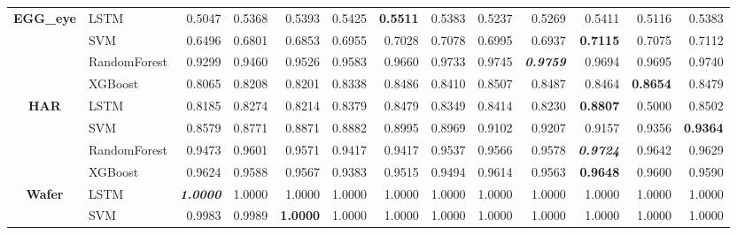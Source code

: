 \begin{table}[H]
\begin{adjustbox}{max width=14cm}
\begin{tabular}{|c|l|r|r|r|r|r|r|r|r|r|r|r|}
			\hline
			\textbf{EGG\_eye}     & LSTM         & 0.5047                   & 0.5368 & 0.5393          & 0.5425 & \textbf{0.5511} & 0.5383 & 0.5237          & 0.5269                   & 0.5411                   & 0.5116          & 0.5383 \\
			                      & SVM          & 0.6496                   & 0.6801 & 0.6853          & 0.6955 & 0.7028          & 0.7078 & 0.6995          & 0.6937                   & \textbf{0.7115}          & 0.7075          & 0.7112 \\
			                      & RandomForest & 0.9299                   & 0.9460 & 0.9526          & 0.9583 & 0.9660          & 0.9733 & 0.9745          & \textit{\textbf{0.9759}} & 0.9694                   & 0.9695          & 0.9740 \\
			                      & XGBoost      & 0.8065                   & 0.8208 & 0.8201          & 0.8338 & 0.8486          & 0.8410 & 0.8507          & 0.8487                   & 0.8464                   & \textbf{0.8654} & 0.8479 \\
			\hline
			\textbf{HAR}          & LSTM         & 0.8185                   & 0.8274 & 0.8214          & 0.8379 & 0.8479          & 0.8349 & 0.8414          & 0.8230                   & \textbf{0.8807}          & 0.5000          & 0.8502 \\
			                      & SVM          & 0.8579                   & 0.8771 & 0.8871          & 0.8882 & 0.8995          & 0.8969 & 0.9102          & 0.9207                   & 0.9157                   & 0.9356          & \textbf{0.9364} \\
			                      & RandomForest & 0.9473                   & 0.9601 & 0.9571          & 0.9417 & 0.9417          & 0.9537 & 0.9566          & 0.9578                   & \textit{\textbf{0.9724}}          & 0.9642          & 0.9629 \\
			                      & XGBoost      & 0.9624                   & 0.9588 & 0.9567          & 0.9383 & 0.9515          & 0.9494 & 0.9614          & 0.9563                   & \textbf{0.9648}                   & 0.9600          & 0.9590 \\
			\hline
			\textbf{Wafer}        & LSTM         & \textit{\textbf{1.0000}}          & 1.0000 & 1.0000          & 1.0000 & 1.0000          & 1.0000 & 1.0000          & 1.0000                   & 1.0000                   & 1.0000          & 1.0000 \\
			                      & SVM          & 0.9983                   & 0.9989 & \textbf{1.0000}          & 1.0000 & 1.0000          & 1.0000 & 1.0000          & 1.0000                   & 1.0000                   & 1.0000          & 1.0000 \\

\end{tabular}
\end{adjustbox}
\end{table}
